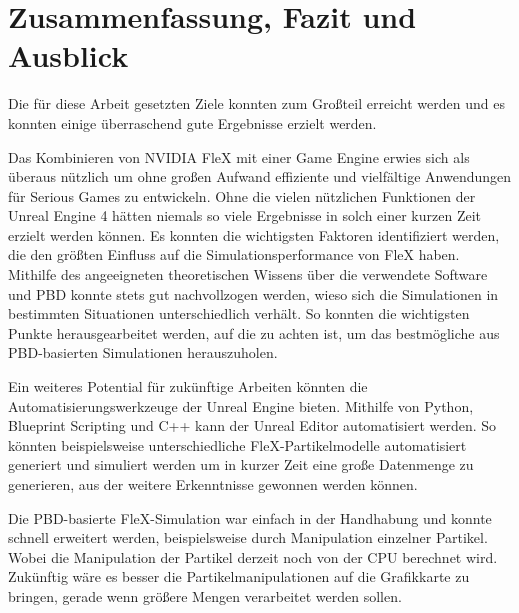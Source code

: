 \chapter{Zusammenfassung, Fazit und Ausblick}

Die für diese Arbeit gesetzten Ziele konnten zum Großteil erreicht werden und es konnten einige überraschend gute Ergebnisse erzielt werden. 

Das Kombinieren von NVIDIA FleX mit einer Game Engine erwies sich als überaus nützlich um ohne großen Aufwand effiziente und vielfältige Anwendungen für Serious Games zu entwickeln. 
Ohne die vielen nützlichen Funktionen der Unreal Engine 4 hätten niemals so viele Ergebnisse in solch einer kurzen Zeit erzielt werden können. 
Es konnten die wichtigsten Faktoren identifiziert werden, die den größten Einfluss auf die Simulationsperformance von FleX haben. Mithilfe des angeeigneten theoretischen Wissens über die verwendete Software und PBD konnte stets gut nachvollzogen werden, wieso sich die Simulationen in bestimmten Situationen unterschiedlich verhält. So konnten die wichtigsten Punkte herausgearbeitet werden, auf die zu achten ist, um das bestmögliche aus PBD-basierten Simulationen herauszuholen.


Ein weiteres Potential für zukünftige Arbeiten könnten die Automatisierungswerkzeuge der Unreal Engine bieten. Mithilfe von Python, Blueprint Scripting und C++ kann der Unreal Editor automatisiert werden. So könnten beispielsweise unterschiedliche FleX-Partikelmodelle automatisiert generiert und simuliert werden um in kurzer Zeit eine große Datenmenge zu generieren, aus der weitere Erkenntnisse gewonnen werden können.

Die PBD-basierte FleX-Simulation war einfach in der Handhabung und konnte schnell erweitert werden, beispielsweise durch Manipulation einzelner Partikel. Wobei die Manipulation der Partikel derzeit noch von der CPU berechnet wird. Zukünftig wäre es besser die Partikelmanipulationen auf die Grafikkarte zu bringen, gerade wenn größere Mengen verarbeitet werden sollen. 

